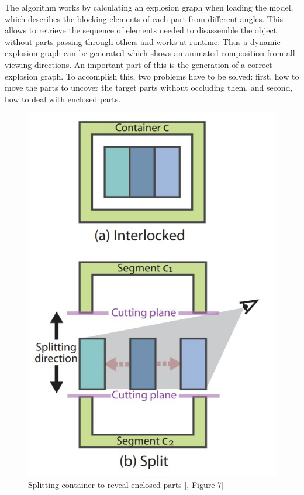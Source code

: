 The algorithm works by calculating an explosion graph when loading the model, which describes the blocking elements of each part from different angles. 
This allows to retrieve the sequence of elements needed to disassemble the object without parts passing through others and works at runtime. 
Thus a dynamic explosion graph can be generated which shows an animated composition from all viewing directions.
An important part of this is the generation of a correct explosion graph. 
To accomplish this, two problems have to be solved: first, how to move the parts to uncover the target parts without occluding them, and second, how to deal with enclosed parts. 
\begin{figure}
	\centering
	\vspace{-0.4cm}
	\includegraphics[width=1\linewidth]{fig/Images/AutomatedGenerationofInteractive3DExplodedViewDiagrams_Li2008_fig7}
	\caption[]{Splitting container to reveal enclosed parts [\cite{Wilmot_Li_2008}, Figure 7]}
	\label{fig:splittingContainer}
	\vspace{-0.8cm}
\end{figure}
